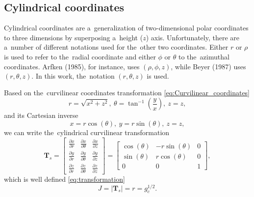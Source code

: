\documentclass[preprint,12pt]{elsarticle}
\newcommand{\pdv}[2]{\frac{\partial{#1}}{\partial{#2}}}
\newcommand{\matr}[1]{\mathbf{#1}}
\begin{document}
\subsection{Cylindrical coordinates}
Cylindrical coordinates are a~generalization of two-dimensional polar 
coordinates to three dimensions by superposing a~height ($z$) axis. 
Unfortunately, there are a~number of different notations used for 
the~other two coordinates. Either  $r$ or $\rho$ is used to refer to 
the~radial coordinate and either $\phi$ or $\theta$ to the~azimuthal 
coordinates. Arfken (1985), for instance, uses $(\rho,\phi,z)$, 
while Beyer (1987) uses $(r,\theta,z)$. 
In this work, the~notation $(r,\theta,z)$ is used.

Based on the~curvilinear coordinates transformation 
\eqref{eq:Curvilinear_coordinates}
\begin{equation}
  r = \sqrt{x^2 + z^2} ,~ 
  \theta = \tan^{-1}\left( \frac{y}{x} \right) ,~ 
  z = z,
  \label{eq:cyl_curvilinear_transformation}
\end{equation}
and its Cartesian inverse
\begin{equation}
  x = r \cos(\theta) ,~ 
  y = r \sin(\theta) ,~ 
  z = z,
  \label{eq:cyl_Cartesian_transformation}
\end{equation}
we can write the~cylindrical curvilinear transformation
\begin{equation}
  \matr{T}_{s} = \begin{bmatrix}
        \pdv{x}{r} & \pdv{x}{\theta} & \pdv{x}{z} \\
        \pdv{y}{r} & \pdv{y}{\theta} & \pdv{y}{z} \\
        \pdv{z}{r} & \pdv{z}{\theta} & \pdv{z}{z} 
	  \end{bmatrix}
  = \begin{bmatrix}
  \cos(\theta) & -r\sin(\theta) & 0 \\
  \sin(\theta) & r\cos(\theta) & 0 \\
  0 & 0 & 1
  \end{bmatrix} ,
  \label{eq:cyl_transformation}
\end{equation}
which is well defined \eqref{eq:transformation}
\begin{equation}
  J = |\matr{T}_{s}| = r = g_c^{1/2}.
  \label{eq:cyl_J}
\end{equation}
\end{document}

